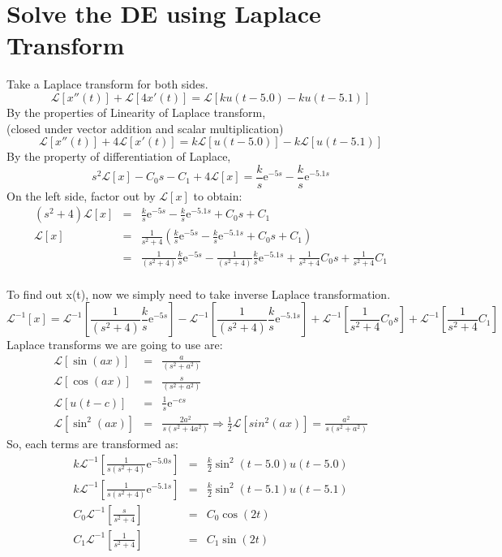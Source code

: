 \documentclass[12pt,letterpaper,fleqn]{article}
\begin{document}
\section{Solve the DE using Laplace Transform}
Take a Laplace transform for both sides.
$$\mathcal{L}[x''(t) ] +\mathcal{L}[4x'(t)] = \mathcal{L}[ku(t-5.0)-ku(t-5.1)] $$
By the properties of Linearity of Laplace transform,\\
(closed under vector addition and scalar multiplication)
$$\mathcal{L}[x''(t)] + 4\mathcal{L}[x'(t)] = k\mathcal{L}[u(t-5.0)] - k\mathcal{L}[u(t-5.1)]$$
By the property of differentiation of Laplace, 
$$ s^2\mathcal{L}[x]-C_0s-C_1+4\mathcal{L}[x] = \frac{k}{s}\mathrm{e}^{-5s}-\frac{k}{s}\mathrm{e}^{-5.1s}  $$ 
On the left side, factor out by $ \mathcal{L}[x]$ to obtain:
\begin{eqnarray*}
(s^2 + 4)\mathcal{L}[x] &=& \frac{k}{s}\mathrm{e}^{-5s}-\frac{k}{s}\mathrm{e}^{-5.1s}+C_0s+C_1\\
\mathcal{L}[x] &=& \frac{1}{s^2 + 4}(\frac{k}{s}\mathrm{e}^{-5s}-\frac{k}{s}\mathrm{e}^{-5.1s}+C_0s+C_1)\\
&=&\frac{1}{(s^2 + 4)}\frac{k}{s}\mathrm{e}^{-5s}-\frac{1}{(s^2 + 4)}\frac{k}{s}\mathrm{e}^{-5.1s}+\frac{1}{s^2 + 4}C_0s+\frac{1}{s^2 + 4}C_1
\end{eqnarray*}\\
To find out x(t), now we simply need to take inverse Laplace transformation.
$$\mathcal{L}^{-1}[x] = \mathcal{L}^{-1}[\frac{1}{(s^2 + 4)}\frac{k}{s}\mathrm{e}^{-5s}]-\mathcal{L}^{-1}[\frac{1}{(s^2 + 4)}\frac{k}{s}\mathrm{e}^{-5.1s}]+\mathcal{L}^{-1}[\frac{1}{s^2 + 4}C_0s]+\mathcal{L}^{-1}[\frac{1}{s^2 + 4}C_1]$$
Laplace transforms we are going to use are:
\begin{eqnarray*}
\mathcal{L}[\sin(ax)] &=& \frac{a}{(s^2+a^2)}\\
\mathcal{L}[\cos(ax)] &=& \frac{s}{(s^2+a^2)}\\
\mathcal{L}[u(t-c)] &=& \frac{1}{s}\mathrm{e}^{-cs}\\
\mathcal{L}[\sin^{2}(ax)] &=& \frac{2a^2}{s(s^2+4a^2)} \Rightarrow \frac{1}{2}\mathcal{L}[sin^{2}(ax)] = \frac{a^2}{s(s^2+a^2)}
\end{eqnarray*}
So, each terms are transformed as:\\
\begin{eqnarray*}
k\mathcal{L}^{-1}[\frac{1}{s(s^2+4)}\mathrm{e}^{-5.0s}] &=& \frac{k}{2}\sin^{2}(t-5.0)u(t-5.0)\\
k\mathcal{L}^{-1}[\frac{1}{s(s^2+4)}\mathrm{e}^{-5.1s}] &=& \frac{k}{2}\sin^{2}(t-5.1)u(t-5.1)\\
C_0\mathcal{L}^{-1}[\frac{s}{s^2+4}] &=& C_0\cos(2t)\\
C_1\mathcal{L}^{-1}[\frac{1}{s^2+4}] &=& C_1\sin(2t)\\
\end{eqnarray*}
\end{document}

